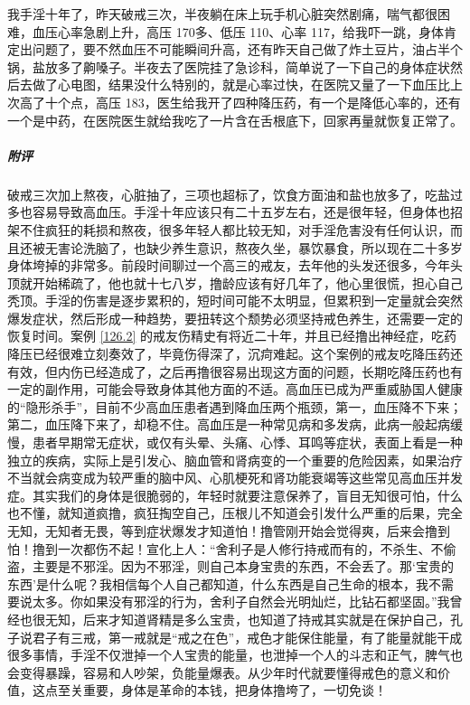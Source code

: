 \begin{case}
    我手淫十年了，昨天破戒三次，半夜躺在床上玩手机心脏突然剧痛，喘气都很困难，血压心率急剧上升，高压 170多、低压 110、心率 117，给我吓一跳，身体肯定出问题了，要不然血压不可能瞬间升高，还有昨天自己做了炸土豆片，油占半个锅，盐放多了齁嗓子。半夜去了医院挂了急诊科，简单说了一下自己的身体症状然后去做了心电图，结果没什么特别的，就是心率过快，在医院又量了一下血压比上次高了十个点，高压 183，医生给我开了四种降压药，有一个是降低心率的，还有一个是中药，在医院医生就给我吃了一片含在舌根底下，回家再量就恢复正常了。
    \subparagraph{附评} 破戒三次加上熬夜，心脏抽了，三项也超标了，饮食方面油和盐也放多了，吃盐过多也容易导致高血压。手淫十年应该只有二十五岁左右，还是很年轻，但身体也招架不住疯狂的耗损和熬夜，很多年轻人都比较无知，对手淫危害没有任何认识，而且还被无害论洗脑了，也缺少养生意识，熬夜久坐，暴饮暴食，所以现在二十多岁身体垮掉的非常多。前段时间聊过一个高三的戒友，去年他的头发还很多，今年头顶就开始稀疏了，他也就十七八岁，撸龄应该有好几年了，他心里很慌，担心自己秃顶。手淫的伤害是逐步累积的，短时间可能不太明显，但累积到一定量就会突然爆发症状，然后形成一种趋势，要扭转这个颓势必须坚持戒色养生，还需要一定的恢复时间。案例 \ref{126.2} 的戒友伤精史有将近二十年，并且已经撸出神经症，吃药降压已经很难立刻奏效了，毕竟伤得深了，沉疴难起。这个案例的戒友吃降压药还有效，但内伤已经造成了，之后再撸很容易出现这方面的问题，长期吃降压药也有一定的副作用，可能会导致身体其他方面的不适。高血压已成为严重威胁国人健康的“隐形杀手”，目前不少高血压患者遇到降血压两个瓶颈，第一，血压降不下来；第二，血压降下来了，却稳不住。高血压是一种常见病和多发病，此病一般起病缓慢，患者早期常无症状，或仅有头晕、头痛、心悸、耳鸣等症状，表面上看是一种独立的疾病，实际上是引发心、脑血管和肾病变的一个重要的危险因素，如果治疗不当就会病变成为较严重的脑中风、心肌梗死和肾功能衰竭等这些常见高血压并发症。其实我们的身体是很脆弱的，年轻时就要注意保养了，盲目无知很可怕，什么也不懂，就知道疯撸，疯狂掏空自己，压根儿不知道会引发什么严重的后果，完全无知，无知者无畏，等到症状爆发才知道怕！撸管刚开始会觉得爽，后来会撸到怕！撸到一次都伤不起！宣化上人：“舍利子是人修行持戒而有的，不杀生、不偷盗，主要是不邪淫。因为不邪淫，则自己本身宝贵的东西，不会丢了。那‘宝贵的东西’是什么呢？我相信每个人自己都知道，什么东西是自己生命的根本，我不需要说太多。你如果没有邪淫的行为，舍利子自然会光明灿烂，比钻石都坚固。”我曾经也很无知，后来才知道肾精是多么宝贵，也知道了持戒其实就是在保护自己，孔子说君子有三戒，第一戒就是“戒之在色”，戒色才能保住能量，有了能量就能干成很多事情，手淫不仅泄掉一个人宝贵的能量，也泄掉一个人的斗志和正气，脾气也会变得暴躁，容易和人吵架，负能量爆表。从少年时代就要懂得戒色的意义和价值，这点至关重要，身体是革命的本钱，把身体撸垮了，一切免谈！
\end{case}

